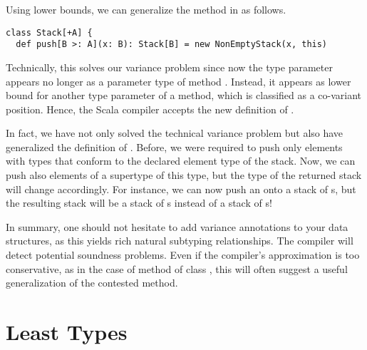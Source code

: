 Using lower bounds, we can generalize the  method in
 as follows.
\begin{lstlisting}
class Stack[+A] {
  def push[B >: A](x: B): Stack[B] = new NonEmptyStack(x, this)
\end{lstlisting}
Technically, this solves our variance problem since now the type
parameter  appears no longer as a parameter type of method
. Instead, it appears as lower bound for another type
parameter of a method, which is classified as a co-variant position.
Hence, the Scala compiler accepts the new definition of .

In fact, we have not only solved the technical variance problem but
also have generalized the definition of .  Before, we were
required to push only elements with types that conform to the declared
element type of the stack. Now, we can push also elements of a
supertype of this type, but the type of the returned stack will change
accordingly. For instance, we can now push an  onto a
stack of s, but the resulting stack will be a stack of
s instead of a stack of s!

In summary, one should not hesitate to add variance annotations to
your data structures, as this yields rich natural subtyping
relationships. The compiler will detect potential soundness
problems. Even if the compiler's approximation is too conservative, as
in the case of method  of class , this will
often suggest a useful generalization of the contested method.

\section{Least Types}

